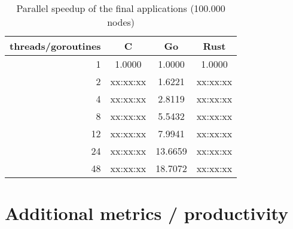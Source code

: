 \begin{table}[htb]
    \centering
    \begin{tabular}{rccc}
        \toprule
            threads/goroutines
            & C
            & Go
            & Rust \\
        \midrule

            1
            & 1.0000
            & 1.0000
            & 1.0000 \\

            2
            & xx:xx:xx
            & 1.6221
            & xx:xx:xx \\

            4
            & xx:xx:xx
            & 2.8119
            & xx:xx:xx \\

            8
            & xx:xx:xx
            & 5.5432
            & xx:xx:xx \\

            12
            & xx:xx:xx
            & 7.9941
            & xx:xx:xx \\

            24
            & xx:xx:xx
            & 13.6659
            & xx:xx:xx \\

            48
            & xx:xx:xx
            & 18.7072
            & xx:xx:xx \\

        \bottomrule
    \end{tabular}
    \caption{Parallel speedup of the final applications (100.000 nodes)}
    \label{tb:final_speedup}
\end{table}

\section{Additional metrics / productivity}
\label{sec:Evaluation::Metrics}

